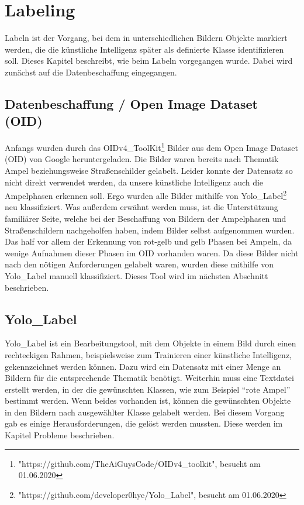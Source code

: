 \documentclass[a4paper,oneside,12pt]{report}
\begin{document}
	\chapter{Labeling}
	\begin{onehalfspace}
		 Labeln ist der Vorgang, bei dem in unterschiedlichen Bildern Objekte markiert werden, die die künstliche Intelligenz später als definierte Klasse identifizieren soll. Dieses Kapitel beschreibt, wie beim Labeln vorgegangen wurde. Dabei wird zunächst auf die Datenbeschaffung eingegangen.
		\section{Datenbeschaffung / Open Image Dataset (OID)}
		Anfangs wurden durch das OIDv4\_ToolKit\footnote{"https://github.com/TheAiGuysCode/OIDv4\_toolkit", besucht am 01.06.2020} 
		Bilder aus dem Open Image Dataset (OID) von Google heruntergeladen. Die Bilder waren bereits nach Thematik Ampel beziehungsweise Straßenschilder gelabelt. Leider konnte der Datensatz so nicht direkt verwendet werden, da unsere künstliche Intelligenz auch die Ampelphasen erkennen soll. Ergo wurden alle Bilder mithilfe von Yolo\_Label\footnote{"https://github.com/developer0hye/Yolo\_Label", besucht am 01.06.2020} 
		neu klassifiziert. Was außerdem erwähnt werden muss, ist die Unterstützung familiärer Seite, welche bei der Beschaffung von Bildern der Ampelphasen und Straßenschildern nachgeholfen haben, indem Bilder selbst aufgenommen wurden. Das half vor allem der Erkennung von rot-gelb und gelb Phasen bei Ampeln, da wenige Aufnahmen dieser Phasen im OID vorhanden waren. Da diese Bilder nicht nach den nötigen Anforderungen gelabelt waren, wurden diese mithilfe von Yolo\_Label manuell klassifiziert. Dieses Tool wird im nächsten Abschnitt beschrieben.
		\section{Yolo\_Label}
		Yolo\_Label ist ein Bearbeitungstool, mit dem Objekte in einem Bild durch einen rechteckigen Rahmen, beispielsweise zum Trainieren einer künstliche Intelligenz, gekennzeichnet werden können. Dazu wird ein Datensatz mit einer Menge an Bildern für die entsprechende Thematik benötigt. Weiterhin muss eine Textdatei erstellt werden, in der die gewünschten Klassen, wie zum Beispiel "`rote Ampel"' bestimmt werden. Wenn beides vorhanden ist, können die gewünschten Objekte in den Bildern nach ausgewählter Klasse gelabelt werden. Bei diesem Vorgang gab es einige Herausforderungen, die gelöst werden mussten. Diese werden im Kapitel Probleme beschrieben.

\end{onehalfspace}
\end{document}
